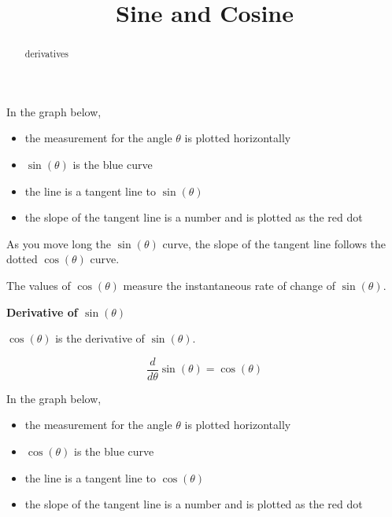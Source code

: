 \documentclass{ximera}
\title{Sine and Cosine}
\begin{document}
\begin{abstract}
derivatives
\end{abstract}
\maketitle








In the graph below, 

\begin{itemize}
\item the measurement for the angle $\theta$ is plotted horizontally
\item $\sin(\theta)$ is the blue curve
\item the line is a tangent line to $\sin(\theta)$
\item the slope of the tangent line is a number and is plotted as the red dot
\end{itemize}

As you move long the $\sin(\theta)$ curve, the slope of the tangent line follows the dotted $\cos(\theta)$ curve.



\begin{center}
\end{center}



The values of $\cos(\theta)$ measure the instantaneous rate of change of $\sin(\theta)$.



\begin{theorem}  \textbf{\textcolor{green!50!black}{Derivative of $\sin(\theta)$}}

\begin{center}
$\cos(\theta)$ is the derivative of $\sin(\theta)$.  
\end{center}


\[
\frac{d}{d\theta} \sin(\theta) = \cos(\theta)
\]

\end{theorem}















In the graph below, 

\begin{itemize}
\item the measurement for the angle $\theta$ is plotted horizontally
\item $\cos(\theta)$ is the blue curve
\item the line is a tangent line to $\cos(\theta)$
\item the slope of the tangent line is a number and is plotted as the red dot
\end{itemize}
\end{document}
